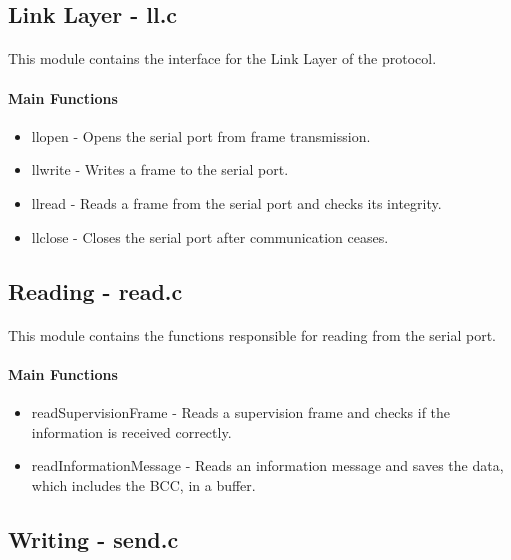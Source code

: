 \documentclass[11pt]{article}
\begin{document}
\subsection{Link Layer - ll.c}

\paragraph{}This module contains the interface for the Link Layer of the protocol.

\paragraph{Main Functions}

\begin{itemize}
        \item{llopen - Opens the serial port from frame transmission.}
        \item{llwrite - Writes a frame to the serial port.}
        \item{llread - Reads a frame from the serial port and checks its integrity.}
        \item{llclose - Closes the serial port after communication ceases.}
\end{itemize}

\subsection{Reading - read.c}

\paragraph{}This module contains the functions responsible for reading from the serial port.

\paragraph{Main Functions}

\begin{itemize}
        \item{readSupervisionFrame - Reads a supervision frame and checks if the information is received correctly.}
        \item{readInformationMessage - Reads an information message and saves the data, which includes the BCC, in a buffer.}
\end{itemize}

\subsection{Writing - send.c}
\end{document}
